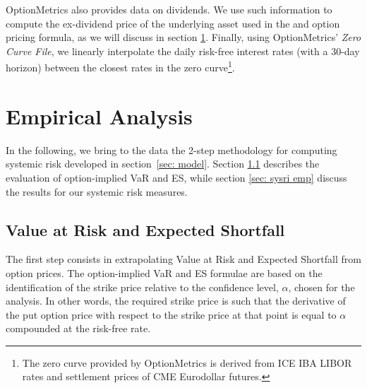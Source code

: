 \documentclass[11pt,a4paper,english]{article}
\begin{document}
OptionMetrics also provides data on dividends. We use such information to compute the ex-dividend price of the underlying asset used in the \citet{Black1973} and \citet{Merton1973} option pricing formula, as we will discuss in section \ref{sec: empirics}. Finally, using OptionMetrics' \textit{Zero Curve File}, we linearly interpolate the daily risk-free interest rates (with a 30-day horizon) between the closest rates in the zero curve\footnote{The zero curve provided by OptionMetrics is derived from ICE IBA LIBOR rates and settlement prices of CME Eurodollar futures.}.


\section{Empirical Analysis}
\label{sec: empirics}
In the following, we bring to the data the 2-step methodology for computing systemic risk developed in section~\ref{sec: model}.  Section \ref{sec: vares emp} describes the evaluation of option-implied VaR and ES, while section \ref{sec: sysri emp} discuss the results for our systemic risk measures. 

\subsection{Value at Risk and Expected Shortfall}
\label{sec: vares emp}
The first step consists in extrapolating Value at Risk and Expected Shortfall from option prices.
The option-implied VaR and ES formulae are based on the identification of the strike price relative to the confidence level, $\alpha$, chosen for the analysis. In other words, the required strike price is such that the derivative of the put option price with respect to the strike price at that point is equal to $\alpha$ compounded at the risk-free rate. 
\end{document}
